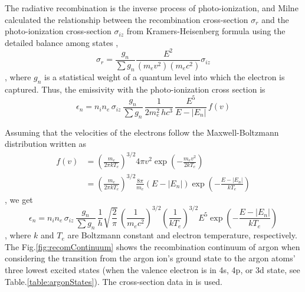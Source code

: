 The radiative recombination is the inverse process of photo-ionization, and Milne calculated the relationship between the recombination cross-section $\sigma_{r}$ and the photo-ionization cross-section $\sigma_{iz}$ from Kramers-Heisenberg formula using the detailed balance among states \cite{seaton1959radiative, karzas1961electron, nahar1997electron},
\begin{equation}
\sigma_{r}=\frac{g_{n}}{\sum g_{n}}\frac{E^{2}}{(m_{e}v^{2})(m_{e}c^{2})}\sigma_{iz}
\end{equation}
, where $g_{n}$ is a statistical weight of a quantum level into which the electron is captured. Thus, the emissivity with the photo-ionization cross section is
\begin{equation}
\epsilon_{n}=n_{i}n_{e}\,\sigma_{iz}\,\frac{g_{n}}{\sum g_{n}}\,\frac{1}{2m_{e}^{2}\,hc^{3}}\,\frac{E^{5}}{E-\left|E_{n}\right|}\,f(v)
\end{equation}

Assuming that the velocities of the electrons follow the Maxwell-Boltzmann distribution written as
\begin{equation}
\begin{aligned}
f(v) &= \left(\frac{m_{e}}{2\pi kT_{e}}\right)^{3/2}4\pi v^{2}\exp\left(-\frac{m_{e}v^{2}}{2kT_{e}}\right)\\
 &= \left(\frac{m_{e}}{2\pi kT_{e}}\right)^{3/2}\frac{8\pi}{m_{e}}\left(E-\left|E_{n}\right|\right)\exp\left(-\frac{E-\left|E_{n}\right|}{kT_{e}}\right)
\end{aligned}
\end{equation}
, we get
\begin{equation}
\epsilon_{n}=n_{i}n_{e}\,\sigma_{iz}\,\frac{g_{n}}{\sum g_{n}}\,\frac{1}{h}\sqrt{\frac{2}{\pi}}\,\left(\frac{1}{m_{e}c^{2}}\right)^{3/2}\left(\frac{1}{kT_{e}}\right)^{3/2}E^{5}\exp\left(-\frac{E-\left|E_{n}\right|}{kT_{e}}\right)\label{eq:em_int}
\end{equation}
, where $k$ and $T_{e}$ are Boltzmann constant and electron temperature, respectively. The Fig.\ref{fig:recomContinuum} shows the recombination continuum of argon when considering the transition from the argon ion's ground state to the argon atoms' three lowest excited states (when the valence electron is in 4s, 4p, or 3d state, see Table.\ref{table:argonStates}). The cross-section data in \cite{duzy1980photoionization} is used.

